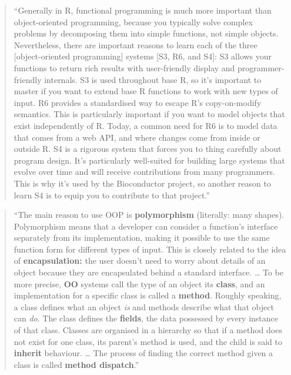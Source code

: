 \documentclass[]{tufte-book}
\begin{document}
\begin{quote}
``Generally in R, functional programming is much more important than object-oriented
programming, because you typically solve complex problems by decomposing them
into simple functions, not simple objects. Nevertheless, there are important reasons
to learn each of the three {[}object-oriented programming{]} systems {[}S3, R6, and S4{]}:
S3 allows your functions to return rich results with user-friendly display and
programmer-friendly internals. S3 is used throughout base R, so it's important to
master if you want to extend base R functions to work with new types of input.
R6 provides a standardised way to escape R's copy-on-modify semantics. This is
particularly important if you want to model objects that exist independently
of R. Today, a common need for R6 is to model data that comes from a web API,
and where changes come from inside or outside R. S4 is a rigorous system that
forces you to thing carefully about program design. It's particularly well-suited
for building large systems that evolve over time and will receive contributions
from many programmers. This is why it's used by the Bioconductor project, so another
reason to learn S4 is to equip you to contribute to that project.'' \citep{wickham2019advanced}
\end{quote}

\begin{quote}
``The main reason to use OOP is \textbf{polymorphism} (literally: many shapes).
Polymorphism means that a developer can consider a function's interface
separately from its implementation, making it possible to use the same function
form for different types of input. This is closely related to the idea of
\textbf{encapsulation:} the user doesn't need to worry about details of an object
because they are encapsulated behind a standard interface. \ldots{} To be more precise,
\textbf{OO} systems call the type of an object its \textbf{class}, and an implementation for
a specific class is called a \textbf{method}. Roughly speaking, a class defines what an
object \emph{is} and methods describe what that object can \emph{do}. The class defines
the \textbf{fields}, the data possessed by every instance of that class. Classes
are organised in a hierarchy so that if a method does not exist for one
class, its parent's method is used, and the child is said to \textbf{inherit} behaviour.
\ldots{} The process of finding the correct method given a class is called
\textbf{method dispatch}.'' \citep{wickham2019advanced}
\end{quote}
\end{document}
